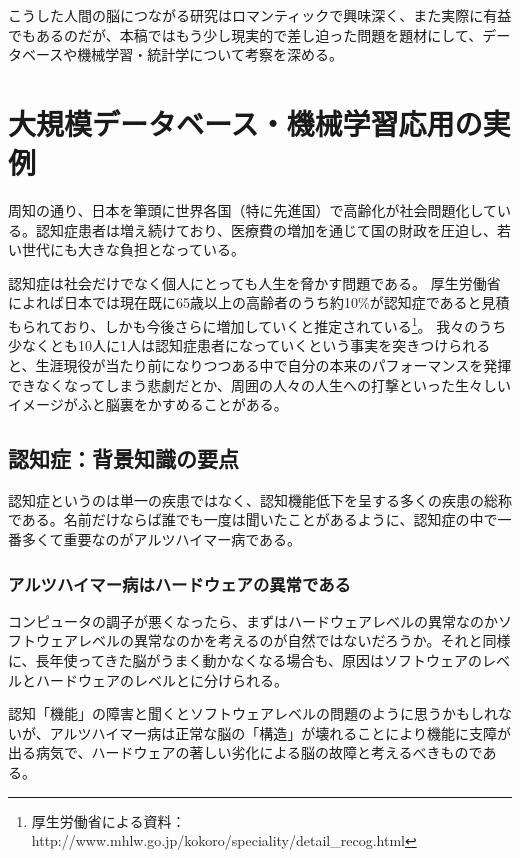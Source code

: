 こうした人間の脳につながる研究はロマンティックで興味深く、また実際に有益でもあるのだが、本稿ではもう少し現実的で差し迫った問題を題材にして、データベースや機械学習・統計学について考察を深める。

\section{大規模データベース・機械学習応用の実例}
周知の通り、日本を筆頭に世界各国（特に先進国）で高齢化が社会問題化している。認知症患者は増え続けており、医療費の増加を通じて国の財政を圧迫し、若い世代にも大きな負担となっている。

認知症は社会だけでなく個人にとっても人生を脅かす問題である。
厚生労働省によれば日本では現在既に65歳以上の高齢者のうち約10\%が認知症であると見積もられており、しかも今後さらに増加していくと推定されている\footnote{厚生労働省による資料：http://www.mhlw.go.jp/kokoro/speciality/detail\_recog.html
}。
我々のうち少なくとも10人に1人は認知症患者になっていくという事実を突きつけられると、生涯現役が当たり前になりつつある中で自分の本来のパフォーマンスを発揮できなくなってしまう悲劇だとか、周囲の人々の人生への打撃といった生々しいイメージがふと脳裏をかすめることがある。

\subsection{認知症：背景知識の要点}
認知症というのは単一の疾患ではなく、認知機能低下を呈する多くの疾患の総称である。名前だけならば誰でも一度は聞いたことがあるように、認知症の中で一番多くて重要なのがアルツハイマー病である。

\subsubsection{アルツハイマー病はハードウェアの異常である}
コンピュータの調子が悪くなったら、まずはハードウェアレベルの異常なのかソフトウェアレベルの異常なのかを考えるのが自然ではないだろうか。それと同様に、長年使ってきた脳がうまく動かなくなる場合も、原因はソフトウェアのレベルとハードウェアのレベルとに分けられる。

認知「機能」の障害と聞くとソフトウェアレベルの問題のように思うかもしれないが、アルツハイマー病は正常な脳の「構造」が壊れることにより機能に支障が出る病気で、ハードウェアの著しい劣化による脳の故障と考えるべきものである。

